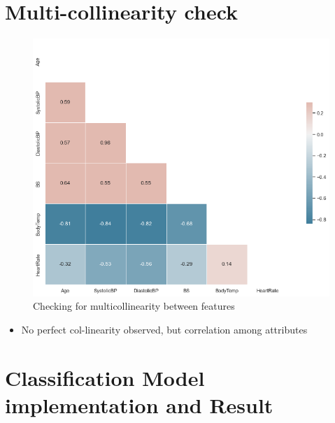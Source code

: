 \documentclass[12pt, letter]{article}
\begin{document}
\pagebreak

\section{Multi-collinearity check}
\begin{figure}[h]
    \centering
    \includegraphics[scale = 0.5]{heat_mult.png}
    \caption{Checking for multicollinearity between features}
    \label{heat_mult}
\end{figure}

\begin{itemize}
    \item No perfect col-linearity observed, but correlation among attributes
\end{itemize}

\pagebreak
\section{Classification Model implementation and Result}

\begin{table}[]
\caption{Model Performance}
\label{Model_perf}
\centering
{}
\end{table}
\end{document}
